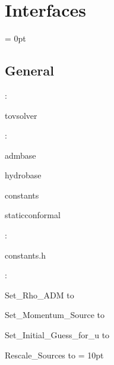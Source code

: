 
\section{Interfaces} 


\parskip = 0pt

\vspace{3mm} \subsection*{General}

: 

tovsolver
\vspace{2mm}

: 

admbase

hydrobase

constants

staticconformal
\vspace{2mm}

\vspace{5mm}

: 

constants.h
\vspace{2mm}

: 



Set\_Rho\_ADM to 

Set\_Momentum\_Source to 

Set\_Initial\_Guess\_for\_u to 

Rescale\_Sources to 
\vspace{2mm}\parskip = 10pt 
